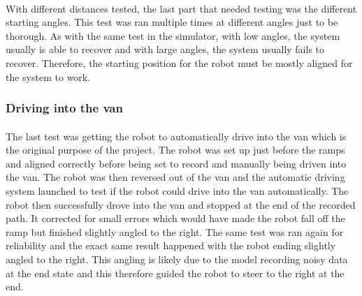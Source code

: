 \paragraph{}
With different distances tested, the last part that needed testing was the different starting angles. This test was ran multiple times at different angles just to be thorough. As with the same test in the simulator, with low angles, the system usually is able to recover and with large angles, the system usually fails to recover. Therefore, the starting position for the robot must be mostly aligned for the system to work.

\subsubsection{Driving into the van}
\paragraph{}
The last test was getting the robot to automatically drive into the van which is the original purpose of the project. The robot was set up just before the ramps and aligned correctly before being set to record and manually being driven into the van. The robot was then reversed out of the van and the automatic driving system launched to test if the robot could drive into the van automatically. The robot then successfully drove into the van and stopped at the end of the recorded path. It corrected for small errors which would have made the robot fall off the ramp but finished slightly angled to the right. The same test was ran again for reliability and the exact same result happened with the robot ending slightly angled to the right. This angling is likely due to the model recording noisy data at the end state and this therefore guided the robot to steer to the right at the end.


